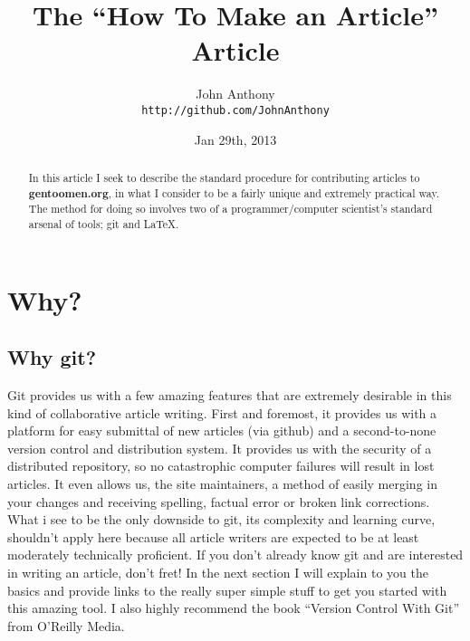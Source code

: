 \documentclass{article}
\begin{document}
\title{The ``How To Make an Article'' Article}
\author{John Anthony\\
  \texttt{http://github.com/JohnAnthony}}
  \date{Jan 29th, 2013}
\maketitle

\begin{abstract}
  In this article I seek to describe the standard procedure for contributing articles to \textbf{gentoomen.org}, in what I consider to be a fairly unique and extremely practical way. The method for doing so involves two of a programmer/computer scientist's standard arsenal of tools; git and \LaTeX{}.
\end{abstract}
        
\section{Why?}
\subsection{Why git?}
  Git provides us with a few amazing features that are extremely desirable in this kind of collaborative article writing. First and foremost, it provides us with a platform for easy submittal of new articles (via github) and a second-to-none version control and distribution system. It provides us with the security of a distributed repository, so no catastrophic computer failures will result in lost articles. It even allows us, the site maintainers, a method of easily merging in your changes and receiving spelling, factual error or broken link corrections. \\
  What i see to be the only downside to git, its complexity and learning curve, shouldn't apply here because all article writers are expected to be at least moderately technically proficient. If you don't already know git and are interested in writing an article, don't fret! In the next section I will explain to you the basics and provide links to the really super simple stuff to get you started with this amazing tool. I also highly recommend the book ``Version Control With Git'' from O'Reilly Media.
\end{document}
